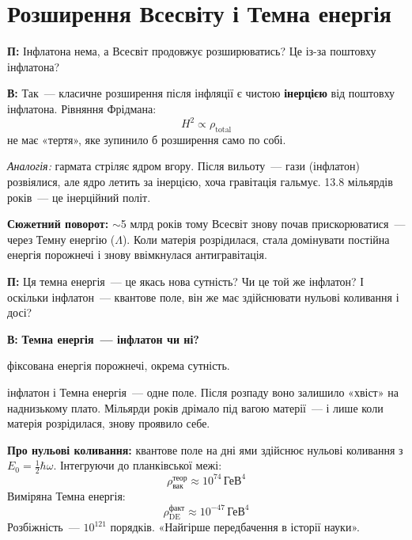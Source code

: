 \documentclass[12pt, a4paper]{article}
\newcommand{\Q}[1]{%
    \begin{questionbox}
        {\color{qcolor}\bfseries\sffamily П:} #1
    \end{questionbox}
}
\newcommand{\A}[1]{%
    \begin{answerbox}
        {\bfseries\sffamily В:} #1
    \end{answerbox}
}
\begin{document}
\section{Розширення Всесвіту і Темна енергія}

\Q{Інфлатона нема, а Всесвіт продовжує розширюватись? Це із-за поштовху інфлатона?}

\A{Так~--- класичне розширення після інфляції є чистою \textbf{інерцією} від поштовху інфлатона. Рівняння Фрідмана:
\begin{equation}
    H^2 \propto \rho_\text{total}
\end{equation}
не має «тертя», яке зупинило б розширення само по собі.

\textit{Аналогія:} гармата стріляє ядром вгору. Після вильоту~--- гази (інфлатон) розвіялися, але ядро летить за інерцією, хоча гравітація гальмує. 13.8 мільярдів років~--- це інерційний політ.

\textbf{Сюжетний поворот:} $\sim$5 млрд років тому Всесвіт знову почав прискорюватися~--- через Темну енергію ($\Lambda$). Коли матерія розрідилася, стала домінувати постійна енергія порожнечі і знову ввімкнулася антигравітація.}


\Q{Ця темна енергія~--- це якась нова сутність? Чи це той же інфлатон? І оскільки інфлатон~--- квантове поле, він же має здійснювати нульові коливання і досі?}

\A{\textbf{Темна енергія~--- інфлатон чи ні?}
\begin{description}[noitemsep]
    \item[$\Lambda$ (косм. константа)] фіксована енергія порожнечі, окрема сутність.
    \item[Квінтесенційна інфляція] інфлатон і Темна енергія~--- одне поле. Після розпаду воно залишило «хвіст» на наднизькому плато. Мільярди років дрімало під вагою матерії~--- і лише коли матерія розрідилася, знову проявило себе.
\end{description}

\textbf{Про нульові коливання:} квантове поле на дні ями здійснює нульові коливання з $E_0 = \tfrac{1}{2}\hbar\omega$. Інтегруючи до планківської межі:
\begin{equation}
    \rho_\text{вак}^\text{теор} \approx 10^{74}\,\text{ГеВ}^4
\end{equation}
Виміряна Темна енергія:
\begin{equation}
    \rho_\text{DE}^\text{факт} \approx 10^{-47}\,\text{ГеВ}^4
\end{equation}
Розбіжність~--- $10^{121}$ порядків. «Найгірше передбачення в історії науки».}
\end{document}
